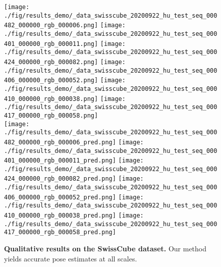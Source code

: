 
\begin{figure*}[t]
    \begin{center}
    \texttt{[image: ./fig/results\_demo/\_data\_swisscube\_20200922\_hu\_test\_seq\_000482\_000000\_rgb\_000006.png]}
    \texttt{[image: ./fig/results\_demo/\_data\_swisscube\_20200922\_hu\_test\_seq\_000401\_000000\_rgb\_000011.png]}
    \texttt{[image: ./fig/results\_demo/\_data\_swisscube\_20200922\_hu\_test\_seq\_000424\_000000\_rgb\_000082.png]}
    \texttt{[image: ./fig/results\_demo/\_data\_swisscube\_20200922\_hu\_test\_seq\_000406\_000000\_rgb\_000052.png]}
    \texttt{[image: ./fig/results\_demo/\_data\_swisscube\_20200922\_hu\_test\_seq\_000410\_000000\_rgb\_000038.png]}
    \texttt{[image: ./fig/results\_demo/\_data\_swisscube\_20200922\_hu\_test\_seq\_000417\_000000\_rgb\_000058.png]} \\
    \texttt{[image: ./fig/results\_demo/\_data\_swisscube\_20200922\_hu\_test\_seq\_000482\_000000\_rgb\_000006\_pred.png]}
    \texttt{[image: ./fig/results\_demo/\_data\_swisscube\_20200922\_hu\_test\_seq\_000401\_000000\_rgb\_000011\_pred.png]}
    \texttt{[image: ./fig/results\_demo/\_data\_swisscube\_20200922\_hu\_test\_seq\_000424\_000000\_rgb\_000082\_pred.png]}
    \texttt{[image: ./fig/results\_demo/\_data\_swisscube\_20200922\_hu\_test\_seq\_000406\_000000\_rgb\_000052\_pred.png]}
    \texttt{[image: ./fig/results\_demo/\_data\_swisscube\_20200922\_hu\_test\_seq\_000410\_000000\_rgb\_000038\_pred.png]}
    \texttt{[image: ./fig/results\_demo/\_data\_swisscube\_20200922\_hu\_test\_seq\_000417\_000000\_rgb\_000058\_pred.png]}
    \end{center}
    \vspace{-6mm}
    \caption{{\bf Qualitative results on the SwissCube dataset.} Our method yields accurate pose estimates at all scales.}
    \label{fig:results_demo}
\end{figure*}